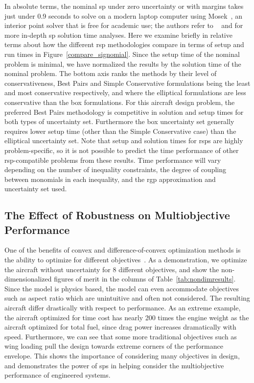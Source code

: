 In absolute
terms, the nominal \gls{sp} under zero uncertainty or with margins
takes just under 0.9 seconds to solve on a modern laptop computer using Mosek~\cite{mosek},
an interior point solver that is free for academic use; the authors
refer to ~\cite{Kirschen2018Log} and \cite{York2018} for more in-depth \gls{sp} solution time analyses.
Here we examine briefly in relative terms about how the different \gls{rsp} methodologies compare in terms of setup and
run times in Figure~\ref{compare_signomial}. Since the setup time of the nominal problem is minimal,
we have normalized the results by the solution time of the nominal problem.
The bottom axis ranks the methods by their level of conservativeness, Best Pairs
and Simple Conservative formulations being the least and most conservative respectively,
and where the elliptical formulations are less conservative than the box formulations.
For this aircraft design problem, the preferred Best Pairs methodology
is competitive in solution and setup times for both types of uncertainty set. Furthermore
the box uncertainty set generally requires lower setup time (other than the Simple Conservative case)
than the elliptical uncertainty set.
Note that setup and solution times for \gls{rsp}s are highly problem-specific, so it is not possible
to predict the time performance of other \gls{rsp}-compatible problems from these results.
Time performance will vary depending on the number of inequality constraints,
the degree of coupling between monomials
in each inequality, and the \gls{rgp} approximation and uncertainty set used.

\subsection{The Effect of Robustness on Multiobjective Performance}

One of the benefits of convex and difference-of-convex optimization methods is the ability to optimize for
different objectives~\cite{York2018}. As a demonstration, we optimize the aircraft without uncertainty
for 8 different objectives, and show
the non-dimensionalized figures of merit in the columns of Table~\ref{tab:nondimresults}.
Since the model is physics based, the model can even accommodate objectives such as aspect ratio
which are unintuitive and often not considered. The resulting aircraft
differ drastically with respect to performance.
As an extreme example,
the aircraft optimized for time cost has nearly 200 times the engine weight as the aircraft
optimized for total fuel, since drag power increases dramatically with speed. Furthermore, we can see
that some more traditional objectives such as wing loading pull the design
towards extreme corners of the performance envelope. This shows the importance of considering many objectives
in design, and demonstrates the power of \gls{sp}s in helping
consider the multiobjective performance of engineered systems.

